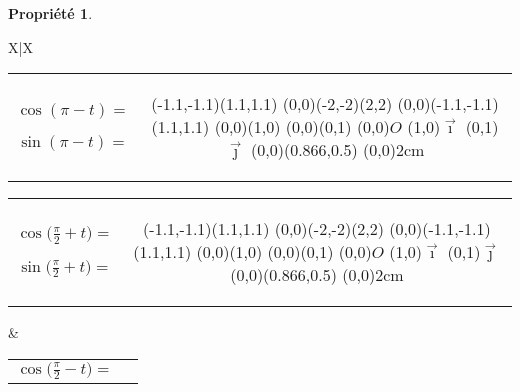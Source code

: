 \documentclass[a4paper,11pt]{article}
\theoremstyle{definition}
\newtheorem*{prop}{Propriété}
\newcommand{\tnl}{\tabularnewline}
\newcommand{\vect}[1]{\overrightarrow{#1}}
\newcommand{\ds}{\displaystyle}
\begin{document}
\begin{prop}
\begin{tabularx}{\linewidth}{X|X}
\begin{minipage}{9cm}

\begin{tabular}{cc}
\begin{minipage}{4.2cm}
$\cos (\pi-t)=$

$\sin(\pi-t)=$
\end{minipage}
& 
\begin{minipage}{4.5cm}
\psset{xunit=2cm , yunit=2cm,algebraic=true}
\begin{pspicture*}(-1.1,-1.1)(1.1,1.1)
\psgrid[subgriddiv=0,gridlabels=0,gridcolor=black,griddots=5,xunit=0.5,yunit=0.5](0,0)(-2,-2)(2,2)
\psaxes[subticks=1,labels=none,ticksize=0]{->}(0,0)(-1.1,-1.1)(1.1,1.1)
\psline{->}(0,0)(1,0)
\psline{->}(0,0)(0,1)
\uput[dl](0,0){$O$}
\uput[dl](1,0){$\vect{\imath}$}
\uput[dl](0,1){$\vect{\jmath}$}
\psline(0,0)(0.866,0.5)
\pscircle(0,0){2cm}
\end{pspicture*}
\end{minipage}
\end{tabular}
\end{minipage}

\tnl


\begin{minipage}{9cm}

\begin{tabular}{cc}
\begin{minipage}{4.2cm}
$\ds \cos \Big(\frac{\pi}2+t\Big)=$

\medskip

$\ds \sin\Big(\frac{\pi}2+t\Big)=$
\end{minipage}
& 
\begin{minipage}{4.5cm}
\psset{xunit=2cm , yunit=2cm,algebraic=true}
\begin{pspicture*}(-1.1,-1.1)(1.1,1.1)
\psgrid[subgriddiv=0,gridlabels=0,gridcolor=black,griddots=5,xunit=0.5,yunit=0.5](0,0)(-2,-2)(2,2)
\psaxes[subticks=1,labels=none,ticksize=0]{->}(0,0)(-1.1,-1.1)(1.1,1.1)
\psline{->}(0,0)(1,0)
\psline{->}(0,0)(0,1)
\uput[dl](0,0){$O$}
\uput[dl](1,0){$\vect{\imath}$}
\uput[dl](0,1){$\vect{\jmath}$}
\psline(0,0)(0.866,0.5)
\pscircle(0,0){2cm}
\end{pspicture*}
\end{minipage}
\end{tabular}
\end{minipage}
&

\begin{minipage}{9cm}

\begin{tabular}{cc}
\begin{minipage}{4.2cm}
$\ds \cos \Big(\frac{\pi}2-t\Big)=$


\end{minipage}
\end{tabular}
\end{minipage}
\end{tabularx}
\end{prop}
\end{document}

